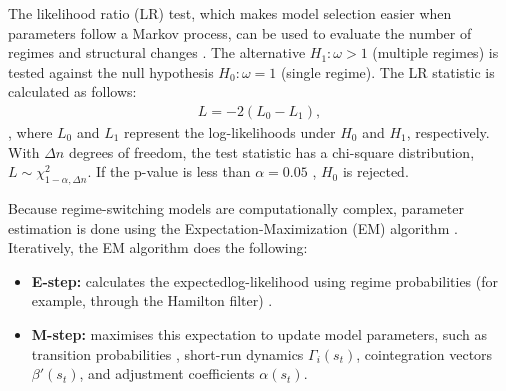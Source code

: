 \documentclass[a4paper]{article}
\theoremstyle{plain}
\theoremstyle{definition}
\theoremstyle{remark}
\begin{document}
The likelihood ratio (LR) test, which makes model selection easier when parameters follow a Markov process, can be used to evaluate the number of regimes and structural changes \citep{qu2021likelihood}. The alternative $H_{1}: \omega > 1$ (multiple regimes) is tested against the null hypothesis $H_{0}: \omega = 1$ (single regime). The LR statistic is calculated as follows: \begin{align} L = -2(L_{0} - L_{1}), \end{align}, where $L_{0}$ and $L_{1}$ represent the log-likelihoods under $H_0$ and $H_1$, respectively. With $\Delta n$ degrees of freedom, the test statistic has a chi-square distribution, $L \sim \chi^2_{1-\alpha,\Delta n}$. If the p-value is less than $\alpha = 0.05$ \citep{qu2021likelihood}, $H_{0}$ is rejected.

Because regime-switching models are computationally complex, parameter estimation is done using the Expectation-Maximization (EM) algorithm \citep{makatjane2024forecasting}. Iteratively, the EM algorithm does the following:
\begin{itemize}
\item \textbf{E-step:} calculates the expectedlog-likelihood using regime probabilities (for example, through the Hamilton filter) \citep{hamilton2002new}.\item \textbf{M-step:} maximises this expectation to update model parameters, such as transition probabilities \citep{kim2017state}, short-run dynamics $\Gamma_i(s_t)$, cointegration vectors $\beta'(s_t)$, and adjustment coefficients $\alpha(s_t)$.
\end{itemize}
\end{document}
